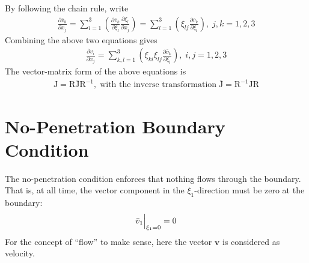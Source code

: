 \documentclass[a4paper,12pt,dvips]{article}
\begin{document}
By following the chain rule, write
\begin{align*}
  \frac{\partial \bar{v}_k}{\partial x_j}
  = \sum_{l=1}^3
    \left(
      \frac{\partial \bar{v}_k}{\partial \xi_l}
      \frac{\partial \xi_l}{\partial x_j}
    \right)
  = \sum_{l=1}^3
    \left( \xi_{lj} \frac{\partial \bar{v}_k}{\partial \xi_l} \right),
  \; j,k = 1, 2, 3
\end{align*}
Combining the above two equations gives
\begin{align*}
  \frac{\partial v_i}{\partial x_j}
  = \sum_{k,l=1}^3
    \left(
      \xi_{ki} \xi_{lj} \frac{\partial \bar{v}_k}{\partial \xi_l}
    \right),
  \; i,j = 1, 2, 3
\end{align*}
The vector-matrix form of the above equations is
\begin{align}
  \mathrm{J} = \mathrm{R\bar{J}R^{-1}},
  \; \mbox{with the inverse transformation} \;
  \bar{\mathrm{J}} = \mathrm{R^{-1}JR}
  \label{e:rotjac}
\end{align}

\section{No-Penetration Boundary Condition}

The no-penetration condition enforces that nothing flows through the boundary.
That is, at all time, the vector component in the $\xi_1$-direction must be
zero at the boundary:
\begin{align*}
  \Bigl.\bar{v}_1\Bigr|_{\xi_1=0} = 0
\end{align*}
For the concept of ``flow'' to make sense, here the vector $\mathbf{v}$ is
considered as velocity.
\end{document}
